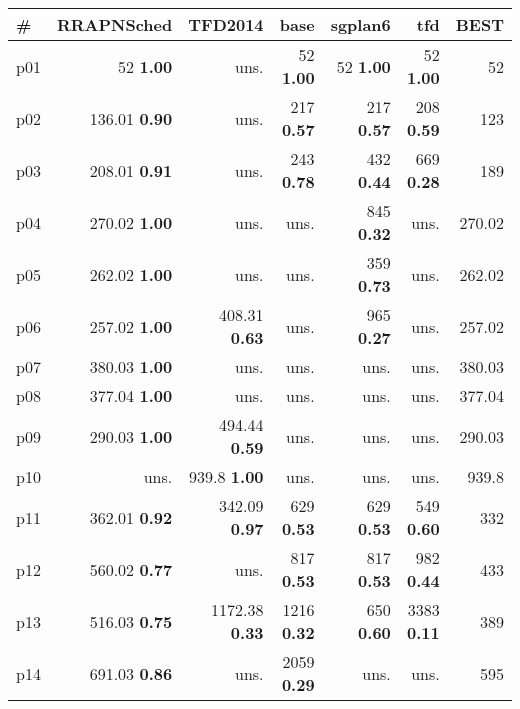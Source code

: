 \begin{tabular}{|l|rrrrr|r|}
\hline
\textbf{\#} & \textbf{RRAPNSched} & \textbf{TFD2014} & \textbf{base} & \textbf{sgplan6} & \textbf{tfd} & \textbf{BEST}\\
\hline
p01 & {\footnotesize 52} \textbf{1.00} & uns. & {\footnotesize 52} \textbf{1.00} & {\footnotesize 52} \textbf{1.00} & {\footnotesize 52} \textbf{1.00} & 52\\
p02 & {\footnotesize 136.01} \textbf{0.90} & uns. & {\footnotesize 217} \textbf{0.57} & {\footnotesize 217} \textbf{0.57} & {\footnotesize 208} \textbf{0.59} & 123\\
p03 & {\footnotesize 208.01} \textbf{0.91} & uns. & {\footnotesize 243} \textbf{0.78} & {\footnotesize 432} \textbf{0.44} & {\footnotesize 669} \textbf{0.28} & 189\\
p04 & {\footnotesize 270.02} \textbf{1.00} & uns. & uns. & {\footnotesize 845} \textbf{0.32} & uns. & 270.02\\
p05 & {\footnotesize 262.02} \textbf{1.00} & uns. & uns. & {\footnotesize 359} \textbf{0.73} & uns. & 262.02\\
p06 & {\footnotesize 257.02} \textbf{1.00} & {\footnotesize 408.31} \textbf{0.63} & uns. & {\footnotesize 965} \textbf{0.27} & uns. & 257.02\\
p07 & {\footnotesize 380.03} \textbf{1.00} & uns. & uns. & uns. & uns. & 380.03\\
p08 & {\footnotesize 377.04} \textbf{1.00} & uns. & uns. & uns. & uns. & 377.04\\
p09 & {\footnotesize 290.03} \textbf{1.00} & {\footnotesize 494.44} \textbf{0.59} & uns. & uns. & uns. & 290.03\\
p10 & uns. & {\footnotesize 939.8} \textbf{1.00} & uns. & uns. & uns. & 939.8\\
p11 & {\footnotesize 362.01} \textbf{0.92} & {\footnotesize 342.09} \textbf{0.97} & {\footnotesize 629} \textbf{0.53} & {\footnotesize 629} \textbf{0.53} & {\footnotesize 549} \textbf{0.60} & 332\\
p12 & {\footnotesize 560.02} \textbf{0.77} & uns. & {\footnotesize 817} \textbf{0.53} & {\footnotesize 817} \textbf{0.53} & {\footnotesize 982} \textbf{0.44} & 433\\
p13 & {\footnotesize 516.03} \textbf{0.75} & {\footnotesize 1172.38} \textbf{0.33} & {\footnotesize 1216} \textbf{0.32} & {\footnotesize 650} \textbf{0.60} & {\footnotesize 3383} \textbf{0.11} & 389\\
p14 & {\footnotesize 691.03} \textbf{0.86} & uns. & {\footnotesize 2059} \textbf{0.29} & uns. & uns. & 595\\

\end{tabular}
